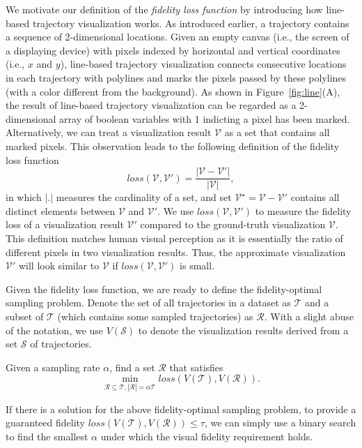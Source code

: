 We motivate our definition of the \textit{fidelity loss function} by introducing how line-based trajectory visualization works. As introduced earlier, a trajectory contains a sequence of 2-dimensional locations. Given an empty canvas (i.e., the screen of a displaying device) with pixels indexed by horizontal and vertical coordinates (i.e., $x$ and $y$), line-based trajectory visualization connects consecutive locations in each trajectory with polylines and marks the pixels passed by these polylines (with a color different from the background). As shown in Figure~\ref{fig:line}(A), the result of line-based trajectory visualization can be regarded as a 2-dimensional array of boolean variables with 1 indicting a pixel has been marked. Alternatively, we can treat a visualization result $\mathcal{V}$ as a set that contains all marked pixels. This observation leads to the following definition of the fidelity loss function
\begin{equation}\label{eqref:loss}
loss(\mathcal{V}, \mathcal{V}')=\frac{|\mathcal{V}-\mathcal{V}'|}{|\mathcal{V}|},
\end{equation}
in which $|.|$ measures the cardinality of a set, and set $\mathcal{V}^\star=\mathcal{V}-\mathcal{V}'$ contains all distinct elements between $\mathcal{V}$ and $\mathcal{V}'$. We use $loss(\mathcal{V}, \mathcal{V}')$ to measure the fidelity loss of a visualization result $\mathcal{V}'$ compared to the ground-truth visualization $\mathcal{V}$. This definition matches human visual perception as it is essentially the ratio of different pixels in two visualization results. Thus, the approximate visualization $\mathcal{V}'$ will look similar to $\mathcal{V}$ if $loss(\mathcal{V}, \mathcal{V}')$ is small.


Given the fidelity loss function, we are ready to define the fidelity-optimal sampling problem. Denote the set of all trajectories in a dataset as $\mathcal{T}$ and a subset of $\mathcal{T}$ (which contains some sampled trajectories) as $\mathcal{R}$. With a slight abuse of the notation, we use $V(\mathcal{S})$ to denote the visualization results derived from a set $\mathcal{S}$ of trajectories.

\begin{problem}\label{prob:def}
	Given a sampling rate $\alpha$, find a set $\mathcal{R}$ that satisfies
	\begin{equation}\label{eq:opp}
	\min_{\mathcal{R} \subseteq \mathcal{T}, |\mathcal{R} | = \alpha \mathcal{T} } loss(V(\mathcal{T}), V(\mathcal{R})).
	\end{equation}
\end{problem}
If there is a solution for the above fidelity-optimal sampling problem, to provide a guaranteed fidelity $loss(V(\mathcal{T}), V(\mathcal{R}))\le \tau$, we can simply use a binary search to find the smallest $\alpha$ under which the visual fidelity requirement holds.

